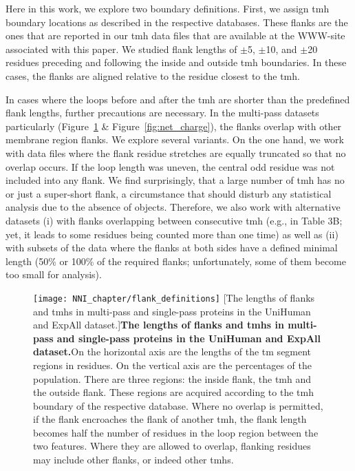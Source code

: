 Here in this work, we explore two boundary definitions.
First, we assign \gls{tmh} boundary locations as described in the respective databases.
These flanks are the ones that are reported in our \gls{tmh} data files that are available at the WWW-site associated with this paper.
We studied flank lengths of $\pm$5, $\pm$10, and $\pm$20 residues preceding and following the inside and outside \gls{tmh} boundaries.
In these cases, the flanks are aligned relative to the residue closest to the \gls{tmh}.

In cases where the loops before and after the \gls{tmh} are shorter than the predefined flank lengths, further precautions are necessary.
In the multi-pass datasets particularly (Figure~\ref{fig:flank_definitions} \& Figure~\ref{fig:net_charge}), the flanks overlap with other membrane region flanks.
We explore several variants.
On the one hand, we work with data files where the flank residue stretches are equally truncated so that no overlap occurs.
If the loop length was uneven, the central odd residue was not included into any flank.
We find surprisingly, that a large number of \gls{tmh} has no or just a super-short flank, a circumstance that should disturb any statistical analysis due to the absence of objects.
Therefore, we also work with alternative datasets (i) with flanks overlapping between consecutive \gls{tmh} (e.g., in Table 3B; yet, it leads to some residues being counted more than one time) as well as (ii) with subsets of the data where the flanks at both sides have a defined minimal length (50\% or 100\% of the required flanks; unfortunately, some of them become too small for analysis).

\begin{figure}[!ht]
\centering
\texttt{[image: NNI\_chapter/flank\_definitions]}
[The lengths of flanks and \gls{tmh}s in multi-pass and single-pass proteins in the UniHuman and ExpAll dataset.]{\textbf{The lengths of flanks and \gls{tmh}s in multi-pass and single-pass proteins in the UniHuman and ExpAll dataset.}On the horizontal axis are the lengths of the \gls{tm} segment regions in residues.
On the vertical axis are the percentages of the population.
There are three regions: the inside flank, the \gls{tmh} and the outside flank.
These regions are acquired according to the \gls{tmh} boundary of the respective database.
Where no overlap is permitted, if the flank encroaches the flank of another \gls{tmh}, the flank length becomes half the number of residues in the loop region between the two features.
Where they are allowed to overlap, flanking residues may include other flanks, or indeed other \gls{tmh}s.}

\label{fig:flank_definitions}
\end{figure}

